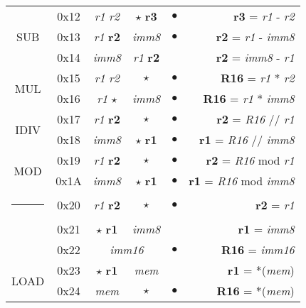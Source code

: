 \documentclass[a4paper,12pt]{article}
\makeatletter
\newcommand{\thickhline}{%
    \noalign {\ifnum 0=`}\fi \hrule height 2pt
    \futurelet \reserved@a \@xhline
}
\makeatother
\begin{document}
\begin{table}[H]
\begin{tabular}{|c|c|c|c|c|r|}
        \hline
        \multirow{3}{*}{SUB} & 0x12 & \textit{r1} \quad \textit{r2}  & $\star$ \quad \textbf{r3} & $\bullet$ & \textbf{r3} = \textit{r1} - \textit{r2}\\
        \cline{2-6}
                             & 0x13 & \textit{r1} \quad \textbf{r2}  & \textit{imm8} & $\bullet$ & \textbf{r2} = \textit{r1} - \textit{imm8}\\
        \cline{2-6}
                             & 0x14 & \textit{imm8} &  \textit{r1} \quad \textbf{r2} & & \textbf{r2} = \textit{imm8} - \textit{r1}\\
        \hline
        \multirow{2}{*}{MUL} & 0x15 & \textit{r1} \quad \textit{r2}  & $\star$ & $\bullet$ & \textbf{R16} = \textit{r1} * \textit{r2}\\
        \cline{2-6}
                             & 0x16 & \textit{r1} \quad $\star$  & \textit{imm8} & $\bullet$ & \textbf{R16} = \textit{r1} * \textit{imm8}\\
        \hline
        \multirow{2}{*}{IDIV}& 0x17 & \textit{r1} \quad \textbf{r2}  & $\star$ & $\bullet$ & \textbf{r2} = \textit{R16} // \textit{r1}\\
        \cline{2-6}
                             & 0x18 & \textit{imm8} & $\star$ \quad \textbf{r1} & $\bullet$ & \textbf{r1} = \textit{R16} // \textit{imm8}\\
        \hline
        \multirow{2}{*}{MOD} & 0x19 & \textit{r1} \quad \textbf{r2}  & $\star$ & $\bullet$ & \textbf{r2} = \textit{R16} mod \textit{r1}\\
        \cline{2-6}
                             & 0x1A & \textit{imm8} & $\star$ \quad \textbf{r1} & $\bullet$ & \textbf{r1} = \textit{R16} mod \textit{imm8}\\
        \thickhline
        \multirow{3}{*}{MOV} & 0x20 & \textit{r1} \quad \textbf{r2} & $\star$ & $\bullet$ & \textbf{r2} = \textit{r1}\\
        \cline{2-6}
                             & 0x21 & $\star$ \quad \textbf{r1} & \textit{imm8} & & \textbf{r1} = \textit{imm8}\\
        \cline{2-6}
                             & 0x22 & \multicolumn{2}{c|}{\textit{imm16}} & $\bullet$ & \textbf{R16} = \textit{imm16} \\
        \hline
        \multirow{2}{*}{LOAD} & 0x23 & $\star$ \quad \textbf{r1} & \textit{mem} & & \textbf{r1} = *(\textit{mem})\\
        \cline{2-6}
                             & 0x24 & \textit{mem} & $\star$ & $\bullet$ & \textbf{R16} = *(\textit{mem})\\

\end{tabular}
\end{table}
\end{document}

